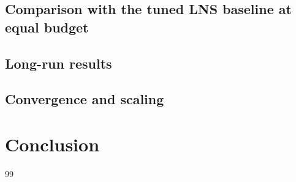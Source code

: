 \documentclass[10pt, a4paper]{article}
\begin{document}
\subsection{Comparison with the tuned LNS baseline at equal budget}
\subsection{Long-run results}
\subsection{Convergence and scaling}

\section{Conclusion}

\begin{thebibliography}{99}
\end{thebibliography}
\end{document}
